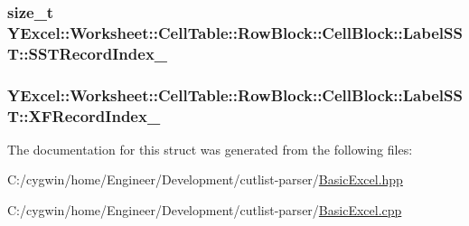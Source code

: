\subsubsection[{S\+S\+T\+Record\+Index\+\_\+}]{\setlength{\rightskip}{0pt plus 5cm}size\+\_\+t Y\+Excel\+::\+Worksheet\+::\+Cell\+Table\+::\+Row\+Block\+::\+Cell\+Block\+::\+Label\+S\+S\+T\+::\+S\+S\+T\+Record\+Index\+\_\+}\label{struct_y_excel_1_1_worksheet_1_1_cell_table_1_1_row_block_1_1_cell_block_1_1_label_s_s_t_a4d0c8a6fc601c69d5686a4538bb31327}
\hypertarget{struct_y_excel_1_1_worksheet_1_1_cell_table_1_1_row_block_1_1_cell_block_1_1_label_s_s_t_a7f007d0cdd0b983521f59572bc5bf49a}{}
\subsubsection[{X\+F\+Record\+Index\+\_\+}]{ Y\+Excel\+::\+Worksheet\+::\+Cell\+Table\+::\+Row\+Block\+::\+Cell\+Block\+::\+Label\+S\+S\+T\+::\+X\+F\+Record\+Index\+\_\+}\label{struct_y_excel_1_1_worksheet_1_1_cell_table_1_1_row_block_1_1_cell_block_1_1_label_s_s_t_a7f007d0cdd0b983521f59572bc5bf49a}


The documentation for this struct was generated from the following files\+:\begin{DoxyCompactItemize}
\item 
C\+:/cygwin/home/\+Engineer/\+Development/cutlist-\/parser/\hyperlink{_basic_excel_8hpp}{Basic\+Excel.\+hpp}\item 
C\+:/cygwin/home/\+Engineer/\+Development/cutlist-\/parser/\hyperlink{_basic_excel_8cpp}{Basic\+Excel.\+cpp}\end{DoxyCompactItemize}

